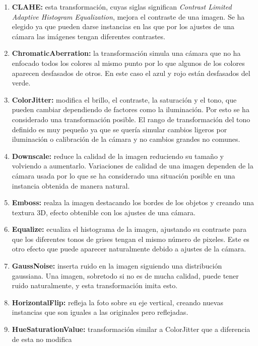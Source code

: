 \documentclass[12pt]{report} %
\begin{document}
    \begin{enumerate} \item \textbf{CLAHE:} esta transformación, cuyas siglas
    significan \textit{Contrast Limited Adaptive Histogram Equalization},
    mejora el contraste de una imagen. Se ha elegido ya que pueden darse
    instancias en las que por los ajustes de una cámara las imágenes
    tengan diferentes contrastes.
    \item \textbf{ChromaticAberration:} la
    transformación simula una cámara que no ha enfocado todos los colores al
    mismo punto por lo que algunos de los colores aparecen desfasados de otros. 
    En este caso el azul y rojo están desfasados del verde.
    \item \textbf{ColorJitter:} modifica el brillo, el contraste, la saturación y el
    tono, que pueden cambiar dependiendo de factores como la iluminación. Por
    esto se ha considerado una transformación posible.  El rango de
    transformación del tono definido es muy pequeño ya que se quería simular
    cambios ligeros por iluminación o calibración de la cámara y no cambios
    grandes no comunes.
    \item \textbf{Downscale:} reduce la calidad de la
    imagen reduciendo su tamaño y volviendo a aumentarlo. Variaciones de
    calidad de una imagen dependen de la cámara usada por lo que se ha
    considerado una situación posible en una instancia obtenida de manera
    natural.
    \item \textbf{Emboss:} realza la imagen destacando los bordes de
    los objetos y creando una textura 3D, efecto obtenible con los ajustes de
    una cámara.
    \item \textbf{Equalize:} ecualiza el histograma de la imagen,
    ajustando su contraste para que los diferentes tonos de grises tengan el
    mismo número de pixeles. Este es otro efecto que puede aparecer
    naturalmente debido a ajustes de la cámara.
    \item \textbf{GaussNoise:}
    inserta ruido en la imagen siguiendo una distribución gaussiana. Una imagen,
    sobretodo si no es de mucha calidad, puede tener ruido naturalmente, y esta
    transformación imita esto.
    \item \textbf{HorizontalFlip:} refleja la foto
    sobre su eje vertical, creando nuevas instancias que son iguales a las
    originales pero reflejadas.
    \item \textbf{HueSaturationValue:}
    transformación similar a ColorJitter que a diferencia de esta no modifica

\end{enumerate}
\end{document}
